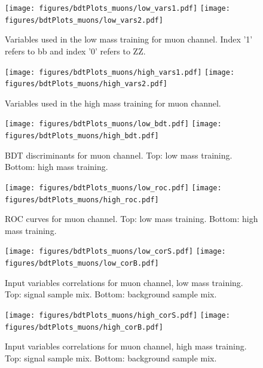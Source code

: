 \begin{figure}[tbp]
  \begin{center}
   \texttt{[image: figures/bdtPlots\_muons/low\_vars1.pdf]}
   \texttt{[image: figures/bdtPlots\_muons/low\_vars2.pdf]}
    \caption{ Variables used in the low mass training for muon channel. Index '1' refers to bb and index '0' refers to ZZ.}
    \label{fig:muon_lowVars}
  \end{center}
\end{figure}



\begin{figure}[tbp]
  \begin{center}
   \texttt{[image: figures/bdtPlots\_muons/high\_vars1.pdf]}
   \texttt{[image: figures/bdtPlots\_muons/high\_vars2.pdf]}
    \caption{ Variables used in the high mass training for muon channel.}
    \label{fig:muon_highVars}
  \end{center}
\end{figure}


\begin{figure}[tbp]
  \begin{center}
   \texttt{[image: figures/bdtPlots\_muons/low\_bdt.pdf]}
   \texttt{[image: figures/bdtPlots\_muons/high\_bdt.pdf]}
    \caption{ BDT discriminants for muon channel. Top: low mass training. Bottom: high mass training. }
    \label{fig:muon_BDTs}
  \end{center}
\end{figure}

\begin{figure}[tbp]
  \begin{center}
   \texttt{[image: figures/bdtPlots\_muons/low\_roc.pdf]}
   \texttt{[image: figures/bdtPlots\_muons/high\_roc.pdf]}
    \caption{ ROC curves for muon channel. Top: low mass training. Bottom: high mass training. }
    \label{fig:muon_ROCs}
  \end{center}
\end{figure}

\begin{figure}[tbp]
  \begin{center}
   \texttt{[image: figures/bdtPlots\_muons/low\_corS.pdf]}
   \texttt{[image: figures/bdtPlots\_muons/low\_corB.pdf]}
    \caption{ Input variables correlations for muon channel, low mass training. Top: signal sample mix. Bottom: background sample mix. }
    \label{fig:muon_cors_low}
  \end{center}
\end{figure}


\begin{figure}[tbp]
  \begin{center}
   \texttt{[image: figures/bdtPlots\_muons/high\_corS.pdf]}
   \texttt{[image: figures/bdtPlots\_muons/high\_corB.pdf]}
    \caption{ Input variables correlations for muon channel, high mass training. Top: signal sample mix. Bottom: background sample mix. }
    \label{fig:muon_cors_high}
  \end{center}
\end{figure}




